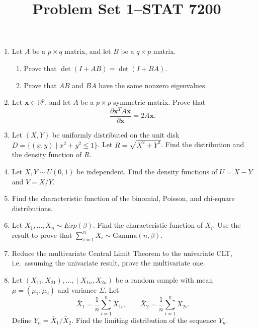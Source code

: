 \documentclass[12pt]{paper}
\title{	
Problem Set 1--STAT 7200
}
\author{} %
\date{} %
\numberwithin{equation}{section} %
\numberwithin{figure}{section} %
\numberwithin{table}{section} %
\begin{document}
\maketitle %


\begin{enumerate}
\item Let $A$ be a $p\times q$ matrix, and let $B$ be a $q\times p$ matrix.
\begin{enumerate}
\item Prove that $\det(I + AB) = \det(I + BA)$.
\item Prove that $AB$ and $BA$ have the same nonzero eigenvalues.
\end{enumerate}
\vspace{1.5cm}\item Let $\mathbf{x}\in\mathbb{R}^p$, and let $A$ be a $p\times p$ symmetric matrix. Prove that
$$ \frac{\partial \mathbf{x}^T A \mathbf{x}}{\partial\mathbf{x}} = 2A\mathbf{x}.$$
\vspace{1.5cm}\item Let $(X, Y)$ be uniformly distributed on the unit disk $D = \{(x,y) \mid x^2 + y^2 \leq 1\}$. Let $R = \sqrt{X^2 + Y^2}$. Find the distribution and the density function of $R$.
\vspace{1.5cm}\item Let $X,Y\sim U(0, 1)$ be independent. Find the density functions of $U = X - Y$ and $V = X/Y$.
\vspace{1.5cm}\item Find the characteristic function of the binomial, Poisson, and chi-square distributions.
\vspace{1.5cm}\item Let $X_1, \ldots, X_n \sim Exp(\beta)$. Find the characteristic function of $X_i$. Use the result to prove that $\sum_{i=1}^nX_i \sim \mathrm{Gamma}(n,\beta)$.
\vspace{1.5cm}\item Reduce the multivariate Central Limit Theorem to the univariate CLT, i.e.\ assuming the univariate result, prove the multivariate one.
\vspace{1.5cm}\item Let $(X_{11}, X_{21}), \ldots, (X_{1n}, X_{2n})$ be a random sample with mean $\mu=(\mu_1, \mu_2)$ and variance $\Sigma$. Let
$$ \bar{X}_1 = \frac{1}{n}\sum_{i=1}^n X_{1i}, \qquad \bar{X}_2 = \frac{1}{n}\sum_{i=1}^n X_{2i}.$$
Define $Y_n = \bar{X}_1/\bar{X}_2$. Find the limiting distribution of the sequence $Y_n$.
\end{enumerate}
\end{document}
